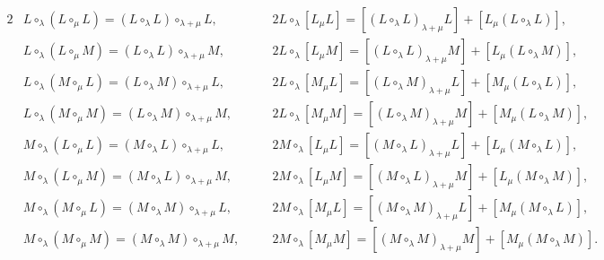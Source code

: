 \documentclass[11pt,letterpaper,reqno]{amsart}
\theoremstyle{definition}
\numberwithin{equation}{section}
\begin{document}
\begin{alignat*}{2}
    &L\circ_\lambda (L\circ_\mu L) = (L\circ_{\lambda} L) \circ_{\lambda+\mu} L, &\quad
    &2L\circ_{\lambda}[L_{\mu}L] = [(L\circ_{\lambda}L)_{\lambda+\mu}L] + [L_{\mu}(L\circ_{\lambda}L)], \\
    &L\circ_\lambda (L\circ_\mu M) = (L\circ_{\lambda} L) \circ_{\lambda+\mu} M, &
    &2L\circ_{\lambda}[L_{\mu}M] = [(L\circ_{\lambda}L)_{\lambda+\mu}M] + [L_{\mu}(L\circ_{\lambda}M)], \\
    &L\circ_\lambda (M\circ_\mu L) = (L\circ_{\lambda} M) \circ_{\lambda+\mu} L, &
    &2L\circ_{\lambda}[M_{\mu}L] = [(L\circ_{\lambda}M)_{\lambda+\mu}L] + [M_{\mu}(L\circ_{\lambda}L)], \\
    &L\circ_\lambda (M\circ_\mu M) = (L\circ_{\lambda} M) \circ_{\lambda+\mu} M, &
    &2L\circ_{\lambda}[M_{\mu}M] = [(L\circ_{\lambda}M)_{\lambda+\mu}M] + [M_{\mu}(L\circ_{\lambda}M)], \\
    &M\circ_\lambda (L\circ_\mu L) = (M\circ_{\lambda} L) \circ_{\lambda+\mu} L, &
    &2M\circ_{\lambda}[L_{\mu}L] = [(M\circ_{\lambda}L)_{\lambda+\mu}L] + [L_{\mu}(M\circ_{\lambda}L)], \\
    &M\circ_\lambda (L\circ_\mu M) = (M\circ_{\lambda} L) \circ_{\lambda+\mu} M, &
    &2M\circ_{\lambda}[L_{\mu}M] = [(M\circ_{\lambda}L)_{\lambda+\mu}M] + [L_{\mu}(M\circ_{\lambda}M)], \\
    &M\circ_\lambda (M\circ_\mu L) = (M\circ_{\lambda} M) \circ_{\lambda+\mu} L, &
    &2M\circ_{\lambda}[M_{\mu}L] = [(M\circ_{\lambda}M)_{\lambda+\mu}L] + [M_{\mu}(M\circ_{\lambda}L)], \\
    &M\circ_\lambda (M\circ_\mu M) = (M\circ_{\lambda} M) \circ_{\lambda+\mu} M, &
    &2M\circ_{\lambda}[M_{\mu}M] = [(M\circ_{\lambda}M)_{\lambda+\mu}M] + [M_{\mu}(M\circ_{\lambda}M)].
\end{alignat*}
\end{document}
